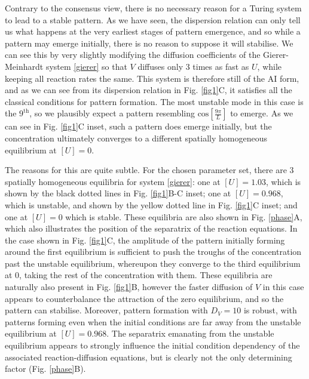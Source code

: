 Contrary to the consensus view, there is no necessary reason for a Turing system to lead to a stable pattern. As we have seen, the dispersion relation can only tell us what happens at the very earliest stages of pattern emergence, and so while a pattern may emerge initially, there is no reason to suppose it will stabilise. We can see this by very slightly modifying the diffusion coefficients of the Gierer-Meinhardt system \eqref{gierer} so that $V$ diffuses only 3 times as fast as $U$, while keeping all reaction rates the same. This system is therefore still of the AI form, and as we can see from its dispersion relation in Fig. \ref{fig1}C, it satisfies all the classical conditions for pattern formation. The most unstable mode in this case is the $9^\text{th}$, so we plausibly expect a pattern resembling $\text{cos}\left[\frac{9\pi}{L}\right]$ to emerge. As we can see in Fig. \ref{fig1}C inset, such a pattern does emerge initially, but the concentration ultimately converges to a different spatially homogeneous equilibrium at $[U]=0$.

The reasons for this are quite subtle. For the chosen parameter set, there are $3$ spatially homogeneous equilibria for system \eqref{gierer}: one at $[U]=1.03$, which is shown by the black dotted lines in Fig. \ref{fig1}B-C inset; one at $[U]=0.968$, which is unstable, and shown by the yellow dotted line in Fig. \ref{fig1}C inset; and one at $[U]=0$ which is stable. These equilibria are also shown in Fig. \ref{phase}A, which also illustrates the position of the separatrix of the reaction equations. In the case shown in Fig. \ref{fig1}C, the amplitude of the pattern initially forming around the first equilibrium is sufficient to push the troughs of the concentration past the unstable equilibrium, whereupon they converge to the third equilibrium at $0$, taking the rest of the concentration with them. These equilibria are naturally also present in Fig. \ref{fig1}B, however the faster diffusion of $V$ in this case appears to counterbalance the attraction of the zero equilibrium, and so the pattern can stabilise. Moreover, pattern formation with $D_V=10$ is robust, with patterns forming even when the initial conditions are far away from the unstable equilibrium at $[U]=0.968$. The separatrix emanating from the unstable equilibrium appears to strongly influence the initial condition dependency of the associated reaction-diffusion equations, but is clearly not the only determining factor (Fig. \ref{phase}B).

